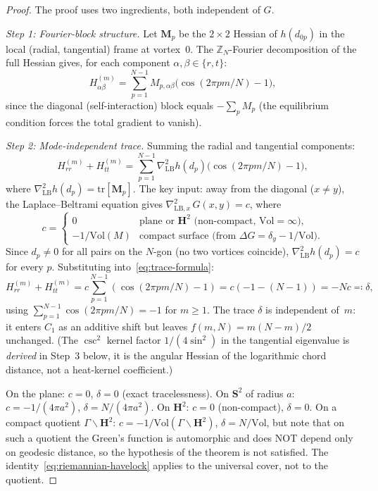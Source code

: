 \begin{proof}
The proof uses two ingredients, both independent of $G$.

\emph{Step 1: Fourier-block structure.}
Let $\mathbf{M}_p$ be the $2{\times}2$ Hessian of $h(d_{0p})$
in the local (radial, tangential) frame at vortex~$0$.
The $\mathbb{Z}_N$-Fourier decomposition of the full Hessian gives,
for each component $\alpha,\beta\in\{r,t\}$:
\[
  H_{\alpha\beta}^{(m)}
  = \sum_{p=1}^{N-1} M_{p,\alpha\beta}
    \bigl(\cos(2\pi pm/N)-1\bigr),
\]
since the diagonal (self-interaction) block equals $-\sum_p M_p$
(the equilibrium condition forces the total gradient to vanish).

\emph{Step 2: Mode-independent trace.}
Summing the radial and tangential components:
\begin{equation}\label{eq:trace-formula}
  H_{rr}^{(m)} + H_{tt}^{(m)}
  = \sum_{p=1}^{N-1} \nabla^2_{\mathrm{LB}} h(d_p)
    \bigl(\cos(2\pi pm/N) - 1\bigr),
\end{equation}
where $\nabla^2_{\mathrm{LB}} h(d_p) =
\mathrm{tr}[\mathbf{M}_p]$.  The key input:
away from the diagonal ($x \ne y$), the Laplace--Beltrami
equation gives $\nabla^2_{\mathrm{LB},x}\,G(x,y) = c$, where
\begin{equation}\label{eq:laplacian-constant}
  c = \begin{cases}
    0 & \text{plane or $\mathbf{H}^2$ (non-compact, $\mathrm{Vol}=\infty$)}, \\
    -1/\mathrm{Vol}(M) & \text{compact surface (from $\Delta G = \delta_y - 1/\mathrm{Vol}$)}.
  \end{cases}
\end{equation}
Since $d_p \ne 0$ for all pairs on the $N$-gon (no two vortices
coincide), $\nabla^2_{\mathrm{LB}} h(d_p) = c$ for every $p$.
Substituting into~\eqref{eq:trace-formula}:
\[
  H_{rr}^{(m)} + H_{tt}^{(m)}
  = c \sum_{p=1}^{N-1}(\cos(2\pi pm/N) - 1)
  = c(-1 - (N{-}1)) = -Nc
  \eqqcolon \delta,
\]
using $\sum_{p=1}^{N-1}\cos(2\pi pm/N) = -1$ for $m \ge 1$.
The trace $\delta$ is independent of~$m$: it enters $C_1$ as an
additive shift but leaves $f(m,N) = m(N{-}m)/2$ unchanged.
(The $\csc^2$ kernel factor $1/(4\sin^2)$ in the tangential
eigenvalue is \emph{derived} in Step~3 below, it is the angular
Hessian of the logarithmic chord distance, not a heat-kernel
coefficient.)

On the plane: $c = 0$, $\delta = 0$ (exact tracelessness).
On $\mathbf{S}^2$ of radius $a$:
$c = -1/(4\pi a^2)$, $\delta = N/(4\pi a^2)$.
On $\mathbf{H}^2$: $c = 0$ (non-compact), $\delta = 0$.
On a compact quotient $\Gamma\backslash\mathbf{H}^2$:
$c = -1/\mathrm{Vol}(\Gamma\backslash\mathbf{H}^2)$,
$\delta = N/\mathrm{Vol}$, but note that on such a quotient
the Green's function is automorphic and does NOT depend only on
geodesic distance, so the hypothesis of the theorem is not
satisfied.  The identity~\eqref{eq:riemannian-havelock}
applies to the universal cover, not to the quotient.


\end{proof}

